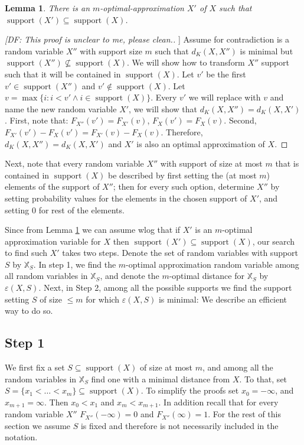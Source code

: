 \documentclass{article}
\newtheorem{lemma}[thm]{Lemma}
\DeclareMathOperator{\support}{support}
\begin{document}
\begin{lemma}\label{lem:supContained}
	There is an $m$-optimal-approximation $X'$ of $X$ such that $\support(X') \subseteq \support(X)$.
\end{lemma}
\begin{proof}
	[[DF: This proof is unclear to me, please clean.]]
	Assume for contradiction is a random variable $X''$ with support size $m$ such that $d_K(X,X'')$ is minimal but $\support(X'')\nsubseteq\support(X)$.
	We will show how to transform $X''$ support such that it will be contained in $\support(X)$. Let $v'$ be the first $v'\in\support(X'')$ and $v' \not\in\support(X)$. Let $v=\max\{i: i<v' \wedge i\in\support(X)\}$. Every $v'$ we will replace with $v$ and name the new random variable $X'$, we will show that $d_K(X,X'') = d_K(X,X')$. First, note that:
	$F_{X''}(v')=F_{X'}(v)$, $F_{X}(v')=F_{X}(v)$.
	Second,  $F_{X'}(v')-F_{X}(v') = F_{X'}(v)-F_{X}(v)$. Therefore, $d_K(X,X'') = d_K(X,X')$ and $X'$ is also an optimal approximation of $X$.
\end{proof}


Next, note that every random variable $X''$ with support of size at most $m$ that is contained in $\support(X)$ be described by first setting the (at most $m$) elements of the support of $X''$; then for every such option, determine $X''$ by setting probability values for the elements in the chosen support of $X'$, and setting $0$ for rest of the elements.

Since from Lemma \ref{lem:supContained} we can assume wlog that if  $X'$ is an $m$-optimal approximation variable for $X$ then $\support(X') \subseteq \support(X)$, our search to find such $X'$ takes two steps. Denote the set of random variables with support $S$ by $\mathbb{X}_S$. In step 1, we find the $m$-optimal approximation random variable among all random variables in $\mathbb{X}_S$, and denote the $m$-optimal distance for $\mathbb{X}_S$ by $\varepsilon(X,S)$. Next, in Step 2, among all the possible supports we find the support setting $S$ of size $\leq m$ for which $\varepsilon(X,S)$ is minimal: We describe an efficient way to do so.

\subsection{Step 1}


We first fix a set $S\subseteq \support(X)$ of size at most $m$, and among all the random variables in $\mathbb{X}_S$ find one with a minimal distance from $X$. To that, set $S=\{x_1<\dots<x_m\} \subseteq \support(X)$. To simplify the proofs set $x_0=-\infty$, and $x_{m+1}=\infty$. Then $x_0<x_1$ and $x_m<x_{m+1}$. In addition recall that for every random variable $X''$ $F_{X''}(-\infty) = 0$ and $F_{X''}(\infty)=1$.
For the rest of this section we assume $S$ is fixed and therefore is not necessarily included in the notation.
\end{document}
